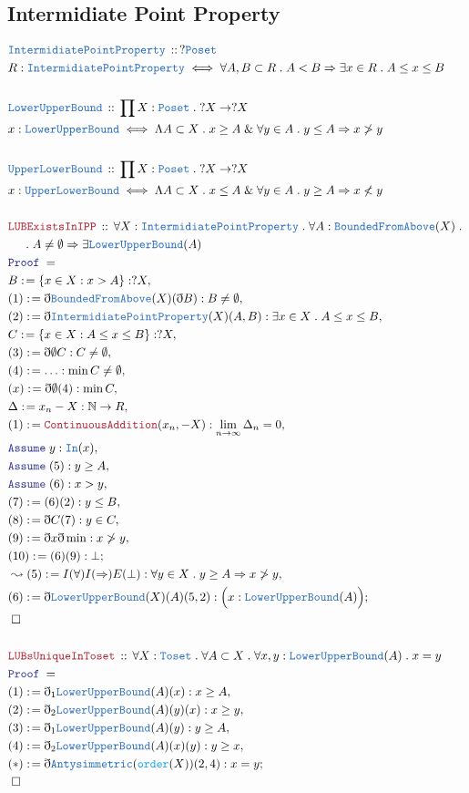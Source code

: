 \documentclass[12pt]{scrartcl}
\newcommand{\TYPE}[1]{\textcolor{NavyBlue}{\mathtt{#1}}}
\newcommand{\FUNC}[1]{\textcolor{Cerulean}{\mathtt{#1}}}
\newcommand{\LOGIC}[1]{\textcolor{Blue}{\mathtt{#1}}}
\newcommand{\THM}[1]{\textcolor{Maroon}{\mathtt{#1}}}
\renewcommand{\.}{\; . \;}
\newcommand{\de}{: \kern 0.1pc =}
\newcommand{\Theorem}[2]{& \THM{#1} \, :: \, #2 \\ & \Proof = \\ }
\newcommand{\DeclareType}[2]{& \TYPE{#1} \, :: \, #2 \\}
\newcommand{\DefineType}[3]{& #1 : \TYPE{#2} \iff #3 \\}
\newcommand{\NewLine}{\\ & \kern 1pc}
\newcommand{\Page}[1]{ \begin{align*} #1 \end{align*}   }
\newcommand{ \bd }{ \ByDef }
\renewcommand{\And}{\; \& \;}
\newcommand{\Nat}{\mathbb{N} }
\newcommand{\Say}[3]{& #1 \de #2 : #3, \\}
\newcommand{\Conclude}[3]{& #1 \de #2 : #3; \\}
\newcommand{\Derive}[3]{& \leadsto #1 \de #2 : #3, \\}
\newcommand{\Assume}[2]{& \LOGIC{Assume} \;#1 : #2, \\}
\newcommand{\QED}{\; \square}
\newcommand{\EndProof}{& \QED \\}
\newcommand{\ByDef}{\eth}
\newcommand{\Proof}{\LOGIC{Proof} \; }
\newcommand{\IPP}{\TYPE{IntermidiatePointProperty}}
\newcommand{\LUB}{\TYPE{LowerUpperBound}}
\begin{document}
\subsection{Intermidiate Point Property}
\Page{
	\DeclareType{IntermidiatePointProperty }{ ?\TYPE{Poset}  }
	\DefineType{R}{IntermidiatePointProperty}{ \forall A,B \subset R \. A <  B \Rightarrow   
		\exists x \in R \. A \le x \le B
	}
	\\
	\DeclareType{LowerUpperBound}{ \prod X : \TYPE{Poset} \. ?X \to ?X }
	\DefineType{x}{LowerUpperBound}{  \Lambda A \subset X \. x \ge A 
		\And \forall y \in A  \. y \le A \Rightarrow x \not > y}
	\\
	\DeclareType{UpperLowerBound}{\prod X : \TYPE{Poset} \. ?X \to ?X}
	\DefineType{x}{UpperLowerBound}{ \Lambda A \subset X \. x \le A
		\And \forall y \in A \. y \ge A \Rightarrow x \not < y}
	\\
	\Theorem{LUBExistsInIPP}{ \forall X : \IPP \. 
		\forall A : \TYPE{BoundedFromAbove}(X) \. 
		 \NewLine  \. A \neq \emptyset \Rightarrow \exists \LUB(A)  }
	\Say{B}{\{ x \in X : x > A  \}}{?X}
	\Say{(1)}{\bd \TYPE{BoundedFromAbove}(X)(\bd B)}{ B \neq \emptyset  }
	\Say{(2)}{ \bd \IPP(X)(A,B) }{ \exists x \in X \. A \le x \le B  }
	\Say{C}{ \{ x \in X : A \le x \le B \}  }{?X}
	\Say{(3)}{  \bd \emptyset C   }{C \neq \emptyset}
	\Say{(4)}{\ldots}{ \min C \neq \emptyset  }
	\Say{(x)}{ \bd \emptyset(4) }{ \min C}
	\Say{\Delta}{  x_n - X    }{\Nat \to R}
	\Say{(1)}{ \THM{ContinuousAddition}(x_n,-X)}{ \lim_{n \to \infty} \Delta_n = 0}
	\Assume{y}{\TYPE{In}(x)}
	\Assume{(5)}{ y \ge A}
	\Assume{(6)}{ x > y}
	\Say{(7)}{(6)(2)}{ y \le B}
	\Say{(8)}{ \bd C (7)      }{  y \in C  }
	\Say{(9)}{ \bd x\bd \min  }{ x \not > y  }
	\Conclude{(10)}{(6)(9)}{\bot}
	\Derive{(5)}{I(\forall)I(\Rightarrow) E(\bot)}{\forall y \in X \. y \ge A \Rightarrow x \not > y}
	\Conclude{(6)}{\bd \LUB(X)(A)(5,2) }{ \Big( x : \LUB(A) \Big) }
	\EndProof
	\\
	\Theorem{LUBsUniqueInToset}{\forall X : \TYPE{Toset} \. \forall A \subset X \. \forall x,y : \LUB(A) \. x = y}
	\Say{(1)}{ \bd_1 \LUB(A)(x)     }{ x \ge A  }
	\Say{(2)}{ \bd_2 \LUB(A)(y)(x)  }{ x \ge y  }
	\Say{(3)}{ \bd_1 \LUB(A)(y)     }{ y \ge A  }
	\Say{(4)}{ \bd_2 \LUB(A)(x)(y)  }{ y \ge x  }
	\Conclude{(*)}{ \bd \TYPE{Antysimmetric}(\FUNC{order}(X))(2,4)    }{ x = y}
	\EndProof
}
\end{document}
